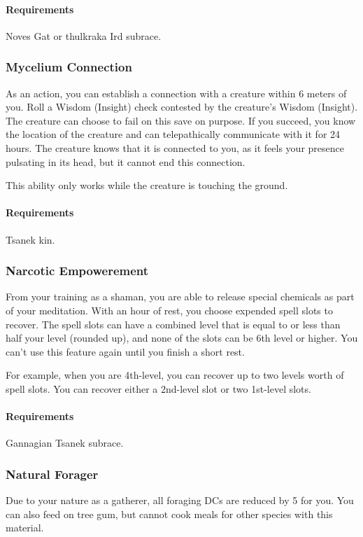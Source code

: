     \paragraph{Requirements} Noves Gat or thulkraka Ird subrace.
\subsubsection{Mycelium Connection} \label{feat::myceliumconnection}
    As an action, you can establish a connection with a creature within 6 meters of you.
    Roll a Wisdom (Insight) check contested by the creature's Wisdom (Insight).
    The creature can choose to fail on this save on purpose.
    If you succeed, you know the location of the creature and can telepathically communicate with it for 24 hours.
    The creature knows that it is connected to you, as it feels your presence pulsating in its head, but it cannot end this connection.

    This ability only works while the creature is touching the ground.
    \paragraph{Requirements} Tsanek kin.
\subsubsection{Narcotic Empowerement} \label{feat::narcoticempowerement}
    From your training as a shaman, you are able to release special chemicals as part of your meditation.
    With an hour of rest, you choose expended spell slots to recover.
    The spell slots can have a combined level that is equal to or less than half your level (rounded up), and none of the slots can be 6th level or higher.
    You can't use this feature again until you finish a short rest.

    For example, when you are 4th-level, you can recover up to two levels worth of spell slots.
    You can recover either a 2nd-level slot or two 1st-level slots.
    \paragraph{Requirements} Gannagian Tsanek subrace.
\subsubsection{Natural Forager} \label{feat::naturalforager}
    Due to your nature as a gatherer, all foraging DCs are reduced by 5 for you.
    You can also feed on tree gum, but cannot cook meals for other species with this material.
